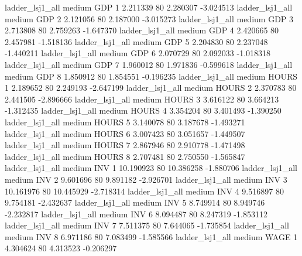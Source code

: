     ladder_lsj1_all     medium      GDP                 1  2.211339 80       2.280307          -3.024513
    ladder_lsj1_all     medium      GDP                 2  2.121056 80       2.187000          -3.015273
    ladder_lsj1_all     medium      GDP                 3  2.713808 80       2.759263          -1.647370
    ladder_lsj1_all     medium      GDP                 4  2.420665 80       2.457981          -1.518136
    ladder_lsj1_all     medium      GDP                 5  2.204830 80       2.237048          -1.440211
    ladder_lsj1_all     medium      GDP                 6  2.070729 80       2.092033          -1.018318
    ladder_lsj1_all     medium      GDP                 7  1.960012 80       1.971836          -0.599618
    ladder_lsj1_all     medium      GDP                 8  1.850912 80       1.854551          -0.196235
    ladder_lsj1_all     medium    HOURS                 1  2.189652 80       2.249193          -2.647199
    ladder_lsj1_all     medium    HOURS                 2  2.370783 80       2.441505          -2.896666
    ladder_lsj1_all     medium    HOURS                 3  3.616122 80       3.664213          -1.312435
    ladder_lsj1_all     medium    HOURS                 4  3.354204 80       3.401493          -1.390250
    ladder_lsj1_all     medium    HOURS                 5  3.140078 80       3.187678          -1.493271
    ladder_lsj1_all     medium    HOURS                 6  3.007423 80       3.051657          -1.449507
    ladder_lsj1_all     medium    HOURS                 7  2.867946 80       2.910778          -1.471498
    ladder_lsj1_all     medium    HOURS                 8  2.707481 80       2.750550          -1.565847
    ladder_lsj1_all     medium      INV                 1 10.190923 80      10.386258          -1.880706
    ladder_lsj1_all     medium      INV                 2  9.601696 80       9.891182          -2.926701
    ladder_lsj1_all     medium      INV                 3 10.161976 80      10.445929          -2.718314
    ladder_lsj1_all     medium      INV                 4  9.516897 80       9.754181          -2.432637
    ladder_lsj1_all     medium      INV                 5  8.749914 80       8.949746          -2.232817
    ladder_lsj1_all     medium      INV                 6  8.094487 80       8.247319          -1.853112
    ladder_lsj1_all     medium      INV                 7  7.511375 80       7.644065          -1.735854
    ladder_lsj1_all     medium      INV                 8  6.971186 80       7.083499          -1.585566
    ladder_lsj1_all     medium     WAGE                 1  4.304624 80       4.313523          -0.206297
